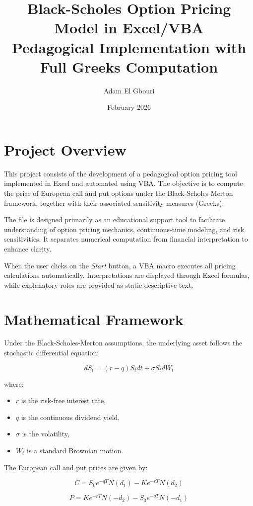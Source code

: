 \documentclass[12pt]{article}
\title{Black-Scholes Option Pricing Model in Excel/VBA\\
Pedagogical Implementation with Full Greeks Computation}
\author{Adam El Gbouri}
\date{February 2026}
\begin{document}
\maketitle

\section{Project Overview}

This project consists of the development of a pedagogical option pricing tool implemented in Excel and automated using VBA. The objective is to compute the price of European call and put options under the Black-Scholes-Merton framework, together with their associated sensitivity measures (Greeks).

The file is designed primarily as an educational support tool to facilitate understanding of option pricing mechanics, continuous-time modeling, and risk sensitivities. It separates numerical computation from financial interpretation to enhance clarity.

When the user clicks on the \textit{Start} button, a VBA macro executes all pricing calculations automatically. Interpretations are displayed through Excel formulas, while explanatory roles are provided as static descriptive text.

\section{Mathematical Framework}

Under the Black-Scholes-Merton assumptions, the underlying asset follows the stochastic differential equation:

\[
dS_t = (r - q) S_t dt + \sigma S_t dW_t
\]

where:

\begin{itemize}
    \item $r$ is the risk-free interest rate,
    \item $q$ is the continuous dividend yield,
    \item $\sigma$ is the volatility,
    \item $W_t$ is a standard Brownian motion.
\end{itemize}

The European call and put prices are given by:

\[
C = S_0 e^{-qT} N(d_1) - K e^{-rT} N(d_2)
\]

\[
P = K e^{-rT} N(-d_2) - S_0 e^{-qT} N(-d_1)
\]
\end{document}
